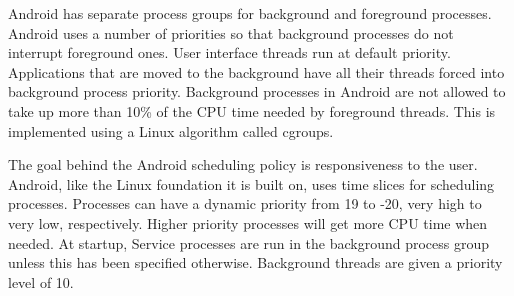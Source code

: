 \documentclass[letterpaper,10pt,titlepage]{article}
\begin{document}
Android has separate process groups for background and foreground processes. Android uses a number of priorities so that background processes do not interrupt foreground ones. User interface threads run at default priority. Applications that are moved to the background have all their threads forced into background process priority. Background processes in Android are not allowed to take up more than 10\% of the CPU time needed by foreground threads. This is implemented using a Linux algorithm called cgroups. \cite{Hackborn}

The goal behind the Android scheduling policy is responsiveness to the user. Android, like the Linux foundation it is built on, uses time slices for scheduling processes. Processes can have a dynamic priority from 19 to -20, very high to very low, respectively. Higher priority processes will get more CPU time when needed. At startup, Service processes are run in the background process group unless this has been specified otherwise. Background threads are given a priority level of 10. \cite{gomo}




%
\end{document}
